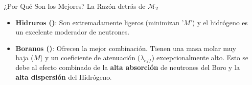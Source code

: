\begin{frame}
  \begin{block}{¿Por Qué Son los Mejores? La Razón detrás de $\mathcal{M}_{2}$}
    \begin{itemize}
      \item \textbf{Hidruros ()}: Son extremadamente ligeros (minimizan
        '$M$') y el hidrógeno es un excelente moderador de neutrones.
      \item \textbf{Boranos ()}: Ofrecen la mejor combinación. Tienen
        una masa molar muy baja ($M$) y un coeficiente de atenuación
        ($\lambda_{eff}$) excepcionalmente alto. Esto se debe al
        efecto combinado de la \textbf{alta absorción} de neutrones del Boro y
        la \textbf{alta dispersión} del Hidrógeno.
    \end{itemize}
  \end{block}
\end{frame}
